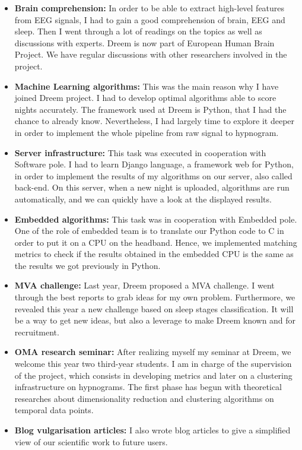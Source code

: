 \documentclass[12pt]{report}
\begin{document}
\begin{itemize}
\item \textbf{Brain comprehension:} In order to be able to extract high-level features from EEG signals, I had to gain a good comprehension of brain, EEG and sleep. Then I went through a lot of readings on the topics as well as discussions with experts. Dreem is now part of European Human Brain Project. We have regular discussions with other researchers involved in the project.
\item \textbf{Machine Learning algorithms:} This was the main reason why I have joined Dreem project. I had to develop optimal algorithms able to score nights accurately. The framework used at Dreem is Python, that I had the chance to already know. Nevertheless, I had largely time to explore it deeper in order to implement the whole pipeline from raw signal to hypnogram.
\item \textbf{Server infrastructure:} This task was executed in cooperation with Software pole. I had to learn Django language, a framework web for Python, in order to implement the results of my algorithms on our server, also called back-end. On this server, when a new night is uploaded, algorithms are run automatically, and we can quickly have a look at the displayed results.
\item \textbf{Embedded algorithms:} This task was in cooperation with Embedded pole. One of the role of embedded team is to translate our Python code to C in order to put it on a CPU on the headband. Hence, we implemented matching metrics to check if the results obtained in the embedded CPU is the same as the results we got previously in Python. 
\item \textbf{MVA challenge:} Last year, Dreem proposed a MVA challenge. I went through the best reports to grab ideas for my own problem. Furthermore, we revealed this year a new challenge based on sleep stages classification. It will be a way to get new ideas, but also a leverage to make Dreem known and for recruitment.
\item \textbf{OMA research seminar:} After realizing myself my seminar at Dreem, we welcome this year two third-year students. I am in charge of the supervision of the project, which consists in developing metrics and later on a clustering infrastructure on hypnograms. The first phase has begun with theoretical researches about dimensionality reduction and clustering algorithms on temporal data points.
\item \textbf{Blog vulgarisation articles:} I also wrote blog articles to give a simplified view of our scientific work to future users.
\end{itemize}
\end{document}
